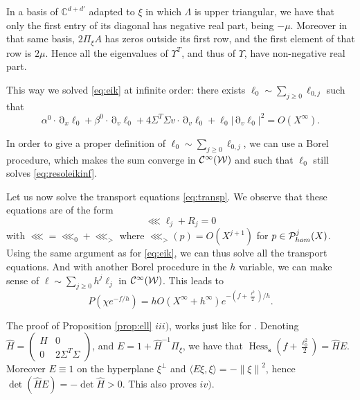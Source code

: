 \documentclass[12pt]{amsart}
\newcommand{\C}{\mathbb C}
\newcommand{\Hess}{\operatorname{Hess}}
\def\<{\langle}
\def\>{\rangle}
\numberwithin{equation}{section}
\numberwithin{figure}{section}
\def\s{\mathbf{s}}
\DeclareMathOperator{\p}{\partial}
\newcommand{\vvert}[1]{\left\lVert#1\right\rVert}
\begin{document}
In a basis of $\C^{d+d'}$ adapted to $\xi$ in which $\Lambda$ is upper triangular, we have that only the first entry of its diagonal has negative real part, being $-\mu$. Moreover in that same basis, $2\Pi_\xi A$ has zeros outside its first row, and the first element of that row is $2\mu$. Hence all the eigenvalues of $\Upsilon^T$, and thus of $\Upsilon$, have non-negative real part.

This way we solved \eqref{eq:eik} at infinite order: there exists $\ell_0\sim\sum_{j\geq0}\ell_{0,j}$ such that
\begin{equation}\label{eq:resoleikinf}
\alpha^0\cdot \p_x\ell_0 + \beta^0\cdot \p_v\ell_0 + 4\Sigma^T\Sigma v\cdot\p_v\ell_0 + \ell_0|\p_v\ell_0|^2 = O(X^\infty).
\end{equation}

In order to give a proper definition of $\ell_0\sim\sum_{j\geq0}\ell_{0,j}$, we can use a Borel procedure, which makes the sum converge in ${\mathcal C}^\infty({\mathcal W})$ and such that $\ell_0$ still solves \eqref{eq:resoleikinf}.

Let us now solve the transport equations \eqref{eq:transp}. We observe that these equations are of the form
\begin{equation*}
\lll\ell_j + R_j = 0
\end{equation*}
with $\lll = \lll_0 + \lll_>$ where $\lll_>(p) = O(X^{j+1})$ for $p\in{\mathcal P}^j_{hom}(X)$. Using the same argument as for \eqref{eq:eik}, we can thus solve all the transport equations. And with another Borel procedure in the $h$ variable, we can make sense of $\ell\sim\sum_{j\geq0}h^j\ell_j$ in ${\mathcal C}^\infty({\mathcal W})$. This leads to
\begin{equation*}
P(\chi e^{-f/h}) = hO(X^\infty + h^\infty)e^{-(f+\frac{\ell^2}{2})/h}.
\end{equation*}

The proof of Proposition \ref{prop:ell} $iii)$, works just like for \cite[Lemma 3.3]{BoLePMi22}. Denoting $\hat H = \begin{pmatrix}H&0\\0&2\Sigma^T\Sigma\end{pmatrix}$, and $E = 1 + \hat H^{-1}\Pi_\xi$, we have that $\Hess_\s(f+\frac{\ell_0^2}{2}) = \hat HE$. Moreover $E \equiv1$ on the hyperplane $\xi^\bot$ and $\<E\xi,\xi\> = -\vvert{\xi}^2$, hence $\det(\hat HE) = -\det \hat H >0$. This also proves $iv)$.
\end{document}
